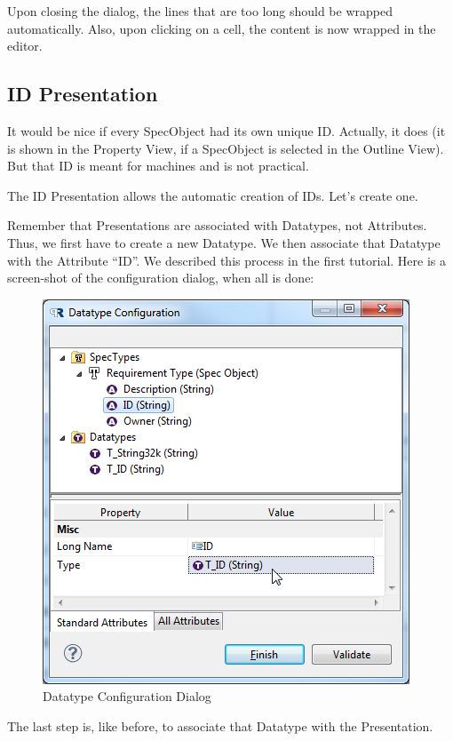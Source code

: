 Upon closing the dialog, the lines that are too long should be wrapped
automatically. Also, upon clicking on a cell, the content is now wrapped
in the editor.

\subsection{ID Presentation}

It would be nice if every SpecObject had its own unique ID. Actually, it
does (it is shown in the Property View, if a SpecObject is selected in
the Outline View). But that ID is meant for machines and is not
practical.

The ID Presentation allows the automatic creation of IDs. Let's create
one.

Remember that Presentations are associated with Datatypes, not
Attributes. Thus, we first have to create a new Datatype. We then
associate that Datatype with the Attribute ``ID''. We described this
process in the first tutorial. Here is a screen-shot of the
configuration dialog, when all is done:

\begin{figure}[h!]
\centering      
\includegraphics[width=0.8\linewidth]{../rmf-images/pror_id_configuration.png}      
\caption{Datatype Configuration Dialog}      
\label{fig:datatypeConfig}
\end{figure}

The last step is, like before, to associate that Datatype with the
Presentation.

